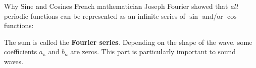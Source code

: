 \documentclass[12pt,aspectratio=169]{beamer}
\begin{document}
\begin{frame}{Why Sine and Cosines}
  French mathematician Joseph Fourier showed that \emph{all} periodic functions
  can be represented as an infinite series of $\sin$ and/or $\cos$ functions:


  The sum is called the \textbf{Fourier series}. Depending on the shape of the
  wave, some coefficients $a_n$ and $b_n$ are zeros. This part is particularly
  important to sound waves.
\end{frame}
\end{document}
